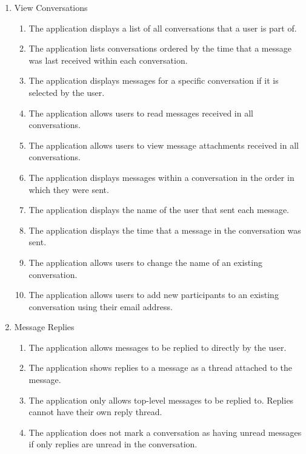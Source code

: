 \begin{enumerate}
  \item View Conversations
  \begin{enumerate}
    \item The application displays a list of all conversations that a user is part of.
    \item The application lists conversations ordered by the time that a message was last received within each conversation.
    \item The application displays messages for a specific conversation if it is selected by the user.
    \item The application allows users to read messages received in all conversations.
    \item The application allows users to view message attachments received in all conversations.
    \item The application displays messages within a conversation in the order in which they were sent.
    \item The application displays the name of the user that sent each message.
    \item The application displays the time that a message in the conversation was sent.
    \item The application allows users to change the name of an existing conversation.
    \item The application allows users to add new participants to an existing conversation using their email address.
  \end{enumerate}

  \item Message Replies
  \begin{enumerate}
    \item The application allows messages to be replied to directly by the user.
    \item The application shows replies to a message as a thread attached to the message.
    \item The application only allows top-level messages to be replied to. Replies cannot have their own reply thread.
    \item The application does not mark a conversation as having unread messages if only replies are unread in the conversation.
  \end{enumerate}
\end{enumerate}

